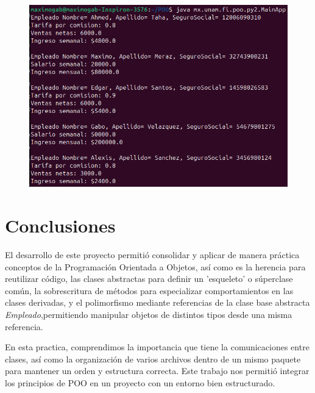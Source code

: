 \documentclass[letterpaper,12pt]{article}
\begin{document}
\begin{figure}[H]
    \centering
    \includegraphics[width=0.8\linewidth]{Imagenes/Resultado.png}
\end{figure}


\section{Conclusiones}
El desarrollo de este proyecto permitió consolidar y aplicar de manera práctica conceptos de la Programación Orientada a Objetos, así como es la herencia para reutilizar código, las clases abstractas para definir un 'esqueleto' o súperclase común, la sobrescritura de métodos para especializar comportamientos en las clases derivadas, y el polimorfismo mediante referencias de la clase base abstracta \textit{Empleado},permitiendo manipular objetos de distintos tipos desde una misma referencia. 

En esta practica, comprendimos la importancia que tiene la comunicaciones entre clases, así como la organización de varios archivos dentro de un mismo paquete para mantener un orden y estructura correcta. Este trabajo nos permitió integrar los principios de POO en un proyecto con un entorno bien estructurado.
 
\printbibliography
\end{document}
